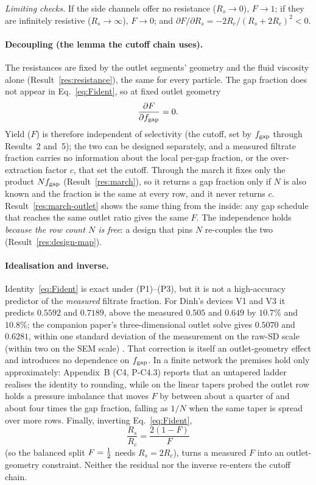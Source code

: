 \emph{Limiting checks.} If the side channels offer no resistance ($R_s\to0$), $F\to 1$; if they
are infinitely resistive ($R_s\to\infty$), $F\to 0$; and
$\partial F/\partial R_s=-2R_c/(R_s+2R_c)^2<0$.

\paragraph{Decoupling (the lemma the cutoff chain uses).} The resistances are fixed by the
outlet segments' geometry and the fluid viscosity alone (Result~\ref{res:resistance}), the same
for every particle. The gap fraction does not appear in Eq.~\eqref{eq:Fident}, so at fixed
outlet geometry
\begin{equation}
\frac{\partial F}{\partial f_{\mathrm{gap}}} = 0 .
\end{equation}
Yield ($F$) is therefore independent of selectivity (the cutoff, set by $f_{\mathrm{gap}}$ through
Results~2 and~5); the two can be designed separately, and a measured filtrate fraction carries
no information about the local per-gap fraction, or the over-extraction factor $c$, that set the
cutoff. Through the march it fixes only the product $Nf_{\mathrm{gap}}$ (Result~\ref{res:march}), so it
returns a gap fraction only if $N$ is also known and the fraction is the same at every row, and it
never returns $c$. Result~\ref{res:march-outlet} shows the same thing from the
inside: any gap schedule that reaches the same outlet ratio gives the same $F$. The
independence holds \emph{because the row count $N$ is free}: a design that pins $N$ re-couples
the two (Result~\ref{res:design-map}).

\paragraph{Idealisation and inverse.} Identity~\eqref{eq:Fident} is exact under (P1)--(P3), but
it is not a high-accuracy predictor of the \emph{measured} filtrate fraction. For Dinh's
devices V1 and V3 it predicts $0.5592$ and $0.7189$, above the measured $0.505$ and $0.649$ by
$10.7\%$ and $10.8\%$; the companion paper's three-dimensional outlet solve gives $0.5070$ and
$0.6281$, within one standard deviation of the measurement on the raw-SD scale (within two on
the SEM scale) \cite{bpre}. That correction is itself an outlet-geometry effect and
introduces no dependence on $f_{\mathrm{gap}}$. In a finite network the premises hold only approximately:
Appendix~B (C4, P-C4.3) reports that an untapered ladder realises the identity to rounding,
while on the linear tapers probed the outlet row holds a pressure imbalance that moves $F$ by
between about a quarter of and about four times the gap fraction, falling as $1/N$ when the same
taper is spread over more rows. Finally, inverting
Eq.~\eqref{eq:Fident},
\begin{equation}
\frac{R_s}{R_c} = \frac{2(1-F)}{F}
\end{equation}
(so the balanced split $F=\tfrac{1}{2}$ needs $R_s = 2R_c$), turns a measured $F$ into an
outlet-geometry constraint. Neither the residual nor the inverse re-enters the cutoff chain.

